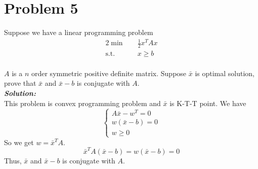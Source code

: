 \documentclass[paper=a4, fontsize=11pt]{scrartcl} %
\numberwithin{equation}{section} %
\numberwithin{figure}{section} %
\numberwithin{table}{section} %
\begin{document}
\section{Problem 5}
Suppose we have a linear programming problem
\begin{alignat}{2}          \nonumber
\min\quad & \frac{1}{2}x^TAx \\    \nonumber
\mbox{s.t.}\quad            \nonumber
& x\geq b
\end{alignat}\\
$A$ is a $n$ order symmetric positive definite matrix. Suppose $\bar{x}$ is optimal solution, prove that $\bar{x}$ and $\bar{x}-b$ is conjugate with $A$.\\
\emph{\textbf{Solution:}}\\
This problem is convex programming problem and $\bar{x}$ is K-T-T point. We have
\begin{equation}
\left\{
\begin{aligned}
A\bar{x}-w^T =0\\
w(\bar{x}-b) = 0\\
w \geq 0
\end{aligned}
\right. \nonumber
\end{equation}
So we get $w=\bar{x}^TA$.
\begin{equation}\nonumber
\bar{x}^TA(\bar{x}-b) = w (\bar{x}-b) = 0
\end{equation}
Thus, $\bar{x}$ and $\bar{x}-b$ is conjugate with $A$.
\end{document}
